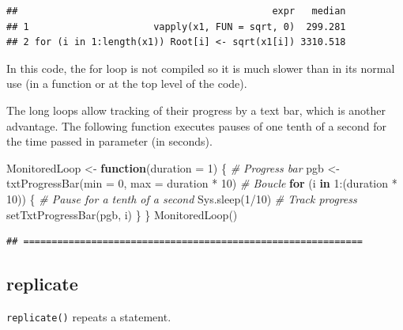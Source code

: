 \documentclass[
  12pt,
  american,
  a4paper,
  extrafontsizes,onecolumn,openright
  ]{memoir}
\newenvironment{Shaded}{\begin{snugshade}}{\end{snugshade}}
\newcommand{\AttributeTok}[1]{\textcolor[rgb]{0.77,0.63,0.00}{#1}}
\newcommand{\CommentTok}[1]{\textcolor[rgb]{0.56,0.35,0.01}{\textit{#1}}}
\newcommand{\ControlFlowTok}[1]{\textcolor[rgb]{0.13,0.29,0.53}{\textbf{#1}}}
\newcommand{\DecValTok}[1]{\textcolor[rgb]{0.00,0.00,0.81}{#1}}
\newcommand{\FunctionTok}[1]{\textcolor[rgb]{0.00,0.00,0.00}{#1}}
\newcommand{\NormalTok}[1]{#1}
\newcommand{\OtherTok}[1]{\textcolor[rgb]{0.56,0.35,0.01}{#1}}
\newcommand{\SpecialCharTok}[1]{\textcolor[rgb]{0.00,0.00,0.00}{#1}}
\begin{document}
\begin{verbatim}
##                                             expr   median
## 1                      vapply(x1, FUN = sqrt, 0)  299.281
## 2 for (i in 1:length(x1)) Root[i] <- sqrt(x1[i]) 3310.518
\end{verbatim}

\normalsize

In this code, the for loop is not compiled so it is much slower than in its normal use (in a function or at the top level of the code).

The long loops allow tracking of their progress by a text bar, which is another advantage.
The following function executes pauses of one tenth of a second for the time passed in parameter (in seconds).

\scriptsize

\begin{Shaded}
\begin{Highlighting}[]
\NormalTok{MonitoredLoop }\OtherTok{\textless{}{-}} \ControlFlowTok{function}\NormalTok{(}\AttributeTok{duration =} \DecValTok{1}\NormalTok{) \{}
    \CommentTok{\# Progress bar}
\NormalTok{    pgb }\OtherTok{\textless{}{-}} \FunctionTok{txtProgressBar}\NormalTok{(}\AttributeTok{min =} \DecValTok{0}\NormalTok{, }\AttributeTok{max =}\NormalTok{ duration }\SpecialCharTok{*} \DecValTok{10}\NormalTok{)}
    \CommentTok{\# Boucle}
    \ControlFlowTok{for}\NormalTok{ (i }\ControlFlowTok{in} \DecValTok{1}\SpecialCharTok{:}\NormalTok{(duration }\SpecialCharTok{*} \DecValTok{10}\NormalTok{)) \{}
        \CommentTok{\# Pause for a tenth of a second}
        \FunctionTok{Sys.sleep}\NormalTok{(}\DecValTok{1}\SpecialCharTok{/}\DecValTok{10}\NormalTok{)}
        \CommentTok{\# Track progress}
        \FunctionTok{setTxtProgressBar}\NormalTok{(pgb, i)}
\NormalTok{    \}}
\NormalTok{\}}
\FunctionTok{MonitoredLoop}\NormalTok{()}
\end{Highlighting}
\end{Shaded}

\begin{verbatim}
## ============================================================
\end{verbatim}

\normalsize

\hypertarget{replicate}{%
\subsection{replicate}\label{replicate}}

\texttt{replicate()} repeats a statement.
\end{document}

